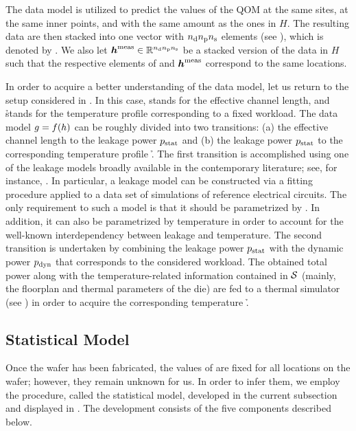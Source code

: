 The data model is utilized to predict the values of the \ac{QOM} at the same
sites, at the same inner points, and with the same amount as the ones in $H$.
The resulting data are then stacked into one vector with ${n_\mathrm{d}} {n_\mathrm{p}} {n_\mathrm{s}}$ elements
(see ), which is denoted by \vh. We also let
$\boldsymbol{h}^{\mathrm{meas}} \in \mathbb{R}^{{n_\mathrm{d}} {n_\mathrm{p}} {n_\mathrm{s}}}$ be a stacked version of the data in $H$
such that the respective elements of \vh and $\boldsymbol{h}^{\mathrm{meas}}$ correspond to the
same locations.

In order to acquire a better understanding of the data model, let us return to
the setup considered in . In this case, \g stands for the
effective channel length, and \h stands for the temperature profile
corresponding to a fixed workload. The data model $g = f(h)$ can be roughly
divided into two transitions: (a) the effective channel length \g to the leakage
power $p_{\mathrm{stat}}$ and (b) the leakage power $p_{\mathrm{stat}}$ to the corresponding
temperature profile \h. The first transition is accomplished using one of the
leakage models broadly available in the contemporary literature; see, for
instance, \cite{chandrakasan2000, srivastava2010, juan2012}. In particular, a
leakage model can be constructed via a fitting procedure applied to a data set
of  simulations of reference electrical circuits. The only requirement
to such a model is that it should be parametrized by \g. In addition, it can
also be parametrized by temperature in order to account for the well-known
interdependency between leakage and temperature. The second transition is
undertaken by combining the leakage power $p_{\mathrm{stat}}$ with the dynamic power
$p_{\mathrm{dyn}}$ that corresponds to the considered workload. The obtained total
power along with the temperature-related information contained in $\mathcal{S}$
(mainly, the floorplan and thermal parameters of the die) are fed to a thermal
simulator (see ) in order to acquire the
corresponding temperature \h.

\subsection{Statistical Model}

Once the wafer has been fabricated, the values of \g are fixed for all
locations on the wafer; however, they remain unknown for us. In order to infer
them, we employ the procedure, called the statistical model, developed in the
current subsection and displayed in . The development consists
of the five components described below.

